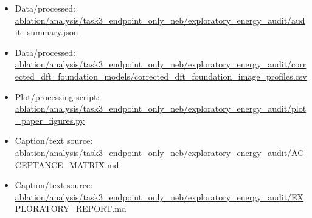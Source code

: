 \begin{itemize}[leftmargin=1.4em,noitemsep]
\item Data/processed: \begingroup\scriptsize\url{ablation/analysis/task3_endpoint_only_neb/exploratory_energy_audit/audit_summary.json}\endgroup
\item Data/processed: \begingroup\scriptsize\url{ablation/analysis/task3_endpoint_only_neb/exploratory_energy_audit/corrected_dft_foundation_models/corrected_dft_foundation_image_profiles.csv}\endgroup
\item Plot/processing script: \begingroup\scriptsize\url{ablation/analysis/task3_endpoint_only_neb/exploratory_energy_audit/plot_paper_figures.py}\endgroup
\item Caption/text source: \begingroup\scriptsize\url{ablation/analysis/task3_endpoint_only_neb/exploratory_energy_audit/ACCEPTANCE_MATRIX.md}\endgroup
\item Caption/text source: \begingroup\scriptsize\url{ablation/analysis/task3_endpoint_only_neb/exploratory_energy_audit/EXPLORATORY_REPORT.md}\endgroup
\end{itemize}
